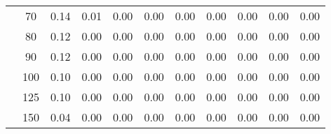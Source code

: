\begin{table}[t]
\begin{center}
\begin{subtable}[c]{\textwidth}
\begin{center}
\begin{tabular}{rcccccccccc}
                                        & \multicolumn{1}{c|}{70}  & \num{0.14}  & \num{0.01}  & \num{0.00}  & \num{0.00}  & \num{0.00}  & \num{0.00}  & \num{0.00}  & \num{0.00}  & \num{0.00}  \\
                                        & \multicolumn{1}{c|}{80}  & \num{0.12}  & \num{0.00}  & \num{0.00}  & \num{0.00}  & \num{0.00}  & \num{0.00}  & \num{0.00}  & \num{0.00}  & \num{0.00}  \\
                                        & \multicolumn{1}{c|}{90}  & \num{0.12}  & \num{0.00}  & \num{0.00}  & \num{0.00}  & \num{0.00}  & \num{0.00}  & \num{0.00}  & \num{0.00}  & \num{0.00}  \\
                                        & \multicolumn{1}{c|}{100}  & \num{0.10}  & \num{0.00}  & \num{0.00}  & \num{0.00}  & \num{0.00}  & \num{0.00}  & \num{0.00}  & \num{0.00}  & \num{0.00}  \\
                                        & \multicolumn{1}{c|}{125}  & \num{0.10}  & \num{0.00}  & \num{0.00}  & \num{0.00}  & \num{0.00}  & \num{0.00}  & \num{0.00}  & \num{0.00}  & \num{0.00}  \\
                                        & \multicolumn{1}{c|}{150}  & \num{0.04}  & \num{0.00}  & \num{0.00}  & \num{0.00}  & \num{0.00}  & \num{0.00}  & \num{0.00}  & \num{0.00}  & \num{0.00}  \\
                                    \end{tabular}
            \end{center}
        \end{subtable}

        \vspace{5mm}


\end{center}
\end{table}
